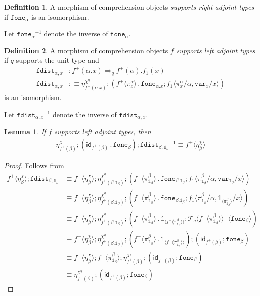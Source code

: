 \documentclass[10pt]{article}
\newtheorem{lemma}{Lemma}
\theoremstyle{definition}
\newtheorem{definition}{Definition}
\newcommand{\tcell}{\Rightarrow}
\newcommand{\id}{\mathsf{id}}
\newcommand\TrPlus[2]{\ensuremath{{#1}^+(#2)}}
\newcommand\ApEl[2]{\mathcal{T}_{#1}\langle#2\rangle}
\newcommand\bdot[0]{\mathbin{.}}
\newcommand\ap[2]{\ensuremath{#1 \langle #2 \rangle }}
\newcommand\ApPlus[2]{\ensuremath{{#1}^+ \langle #2 \rangle }}
\newcommand\One{\ensuremath{\mathds{1}}}
\newcommand\var[1]{\ensuremath{\mathtt{var}_{#1}}}
\newcommand\ApOne[1]{\ensuremath{\One_{\langle {#1} \rangle }}}
\newcommand\fone[1]{\ensuremath{\mathtt{fone}_{#1}}}
\newcommand\foneinv[1]{\ensuremath{\fone{#1}^{-1}}}
\newcommand\fdist[1]{\ensuremath{\mathtt{fdist}_{#1}}}
\newcommand\fdistinv[1]{\ensuremath{\fdist{#1}^{-1}}}
\begin{document}
\begin{definition}
A morphism of comprehension objects \emph{supports right adjoint types} if $\fone{\alpha}$ is an isomorphism.
\end{definition}
Let $\foneinv{\alpha}$ denote the inverse of $\fone{\alpha}$.

\begin{definition}
A morphism of comprehension objects $f$ \emph{supports left adjoint types} if  $q$ supports the unit type and 
\begin{align*}
\fdist{\alpha, x} &: \TrPlus{f}{\alpha.x} \tcell_q \TrPlus{f}{\alpha}.f_1(x) \\
\fdist{\alpha, x} &:\equiv \eta^{\chi^q}_{\TrPlus{f}{\alpha.x}} ; (\ApPlus{f}{\pi^\alpha_x} \bdot \fone{\alpha.x};\ap{f_1}{\pi^\alpha_x/\alpha, \var{x}/x})
\end{align*}
is an isomorphism.
\end{definition}
Let $\fdistinv{\alpha,x}$ denote the inverse of $\fdist{\alpha,x}$.

\begin{lemma}
If $f$ supports left adjoint types, then
\begin{align*}
\eta^\chi_{\TrPlus{f}{\beta}};(\id_{\TrPlus{f}{\beta}} \bdot \fone{\beta});\fdistinv{\beta, \One_\beta} \equiv \ApPlus{f}{\eta^\chi_\beta}
\end{align*}
\end{lemma}
\begin{proof}
Follows from
\begin{align*}
\ApPlus{f}{\eta^\chi_\beta};\fdist{\beta, \One_\beta}
&\equiv \ApPlus{f}{\eta^\chi_\beta};\eta^{\chi^q}_{\TrPlus{f}{\beta.\One_\beta}} ; (\ApPlus{f}{\pi^\beta_{\One_\beta}} \bdot \fone{\beta.\One_\beta};\ap{f_1}{\pi^\beta_{\One_\beta}/\alpha, \var{\One_\beta}/x}) \\
&\equiv \ApPlus{f}{\eta^\chi_\beta};\eta^{\chi^q}_{\TrPlus{f}{\beta.\One_\beta}} ; (\ApPlus{f}{\pi^\beta_{\One_\beta}} \bdot \fone{\beta.\One_\beta};\ap{f_1}{\pi^\beta_{\One_\beta}/\alpha, \ApOne{\pi^\beta_{\One_\beta}}/x}) \\
&\equiv \ApPlus{f}{\eta^\chi_\beta};\eta^{\chi^q}_{\TrPlus{f}{\beta.\One_\beta}} ; (\ApPlus{f}{\pi^\beta_{\One_\beta}} \bdot \ApOne{\ApPlus{f}{\pi^\beta_{\One_\beta}}};\ApPlus{\ApEl{q}{\ApPlus{f}{\pi^\beta_{\One_\beta}}}}{\fone{\beta}}) \\
&\equiv \ApPlus{f}{\eta^\chi_\beta};\eta^{\chi^q}_{\TrPlus{f}{\beta.\One_\beta}} ; (\ApPlus{f}{\pi^\beta_{\One_\beta}} \bdot \ApOne{\ApPlus{f}{\pi^\beta_{\One_\beta}}});(\id_{\TrPlus{f}{\beta}} ; \fone{\beta}) \\
&\equiv \ApPlus{f}{\eta^\chi_\beta}; \ApPlus{f}{\pi^\beta_{\One_\beta}} ; \eta^{\chi^q}_{\TrPlus{f}{\beta}} ; (\id_{\TrPlus{f}{\beta}} ; \fone{\beta}) \\
&\equiv \eta^{\chi^q}_{\TrPlus{f}{\beta}} ; (\id_{\TrPlus{f}{\beta}} ; \fone{\beta})
\end{align*}
\end{proof}
\end{document}

